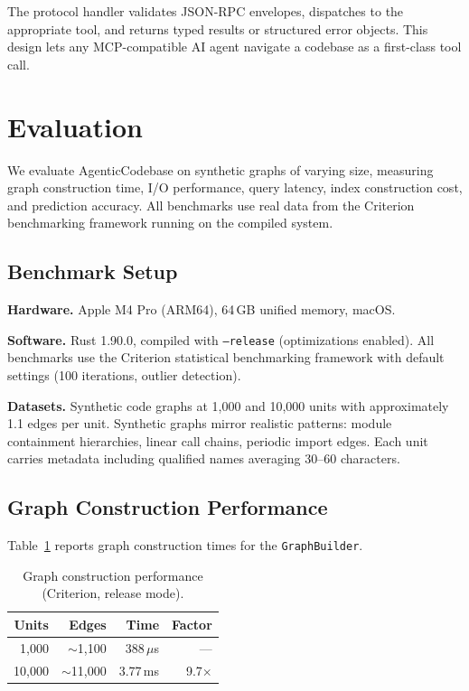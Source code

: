 \documentclass[10pt, twocolumn]{article}
\begin{document}
The protocol handler validates JSON-RPC envelopes, dispatches to the appropriate tool, and returns typed results or structured error objects. This design lets any MCP-compatible AI agent navigate a codebase as a first-class tool call.


\section{Evaluation}
\label{sec:evaluation}

We evaluate AgenticCodebase on synthetic graphs of varying size, measuring graph construction time, I/O performance, query latency, index construction cost, and prediction accuracy. All benchmarks use real data from the Criterion~\cite{criterion2023} benchmarking framework running on the compiled system.

\subsection{Benchmark Setup}

\textbf{Hardware.} Apple M4 Pro (ARM64), 64\,GB unified memory, macOS.

\textbf{Software.} Rust 1.90.0, compiled with \texttt{--release} (optimizations enabled). All benchmarks use the Criterion statistical benchmarking framework with default settings (100 iterations, outlier detection).

\textbf{Datasets.} Synthetic code graphs at 1{,}000 and 10{,}000 units with approximately 1.1 edges per unit. Synthetic graphs mirror realistic patterns: module containment hierarchies, linear call chains, periodic import edges. Each unit carries metadata including qualified names averaging 30--60 characters.

\subsection{Graph Construction Performance}

Table~\ref{tab:construction} reports graph construction times for the \texttt{GraphBuilder}.

\begin{table}[t]
\caption{Graph construction performance (Criterion, release mode).}
\label{tab:construction}
\centering
\small
\begin{tabular}{@{}rrrr@{}}
\toprule
\textbf{Units} & \textbf{Edges} & \textbf{Time} & \textbf{Factor} \\
\midrule
1{,}000  & $\sim$1{,}100  & 388\,$\mu$s & --- \\
10{,}000 & $\sim$11{,}000 & 3.77\,ms & 9.7$\times$ \\
\bottomrule
\end{tabular}
\end{table}
\end{document}
